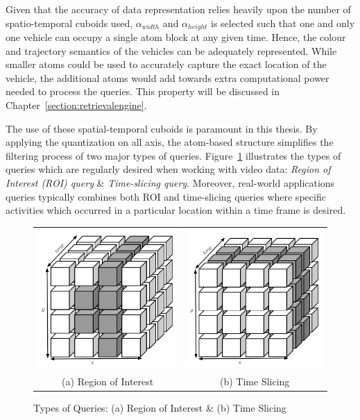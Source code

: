 Given that the accuracy of data representation relies heavily upon the number of spatio-temporal cuboids used, $\alpha_{width}$ and $\alpha_{height}$ is selected such that one and only one vehicle can occupy a single atom block at any given time. Hence, the colour and trajectory semantics of the vehicles can be adequately represented.
While smaller atoms could be used to accurately capture the exact location of the vehicle, the additional atoms would add towards extra computational power needed to process the queries. This property will be discussed in Chapter~\ref{section:retrievalengine}.

The use of these spatial-temporal cuboids is paramount in this thesis.
By applying the quantization on all axis, the atom-based structure simplifies the filtering process of two major types of queries.
Figure~\ref{fig:typesofQuery} illustrates the types of queries which are regularly desired when working with video data: \textit{Region of Interest (ROI) query} \& \textit{Time-slicing query}.
Moreover, real-world applications queries typically combines both ROI and time-slicing queries where specific activities which occurred in a particular location within a time frame is desired.


\begin{figure}[htb!]
  \centering
  \begin{tabular}{cc}
  \includegraphics[width=0.3\linewidth]{image/general/atom_ROI.PNG} &
  \includegraphics[width=0.3\linewidth]{image/general/atom_time_slicing.PNG}\\
  (a) Region of Interest & (b) Time Slicing
  \end{tabular}
  \caption{Types of Queries: (a) Region of Interest \& (b) Time Slicing}
  \label{fig:typesofQuery}
\end{figure}



